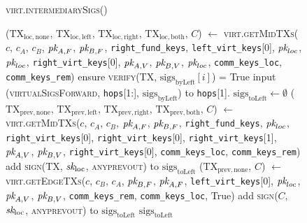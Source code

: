 \begin{figure}[H]
  \begin{processbox}{\textsc{virt.intermediarySigs}()}
    \begin{algorithmic}[1]
      \Indent
        \State ($\mathrm{TX}_{\mathrm{loc}, \mathrm{none}}$,
        $\mathrm{TX}_{\mathrm{loc}, \mathrm{left}}$, $\mathrm{TX}_{\mathrm{loc},
        \mathrm{right}}$, $\mathrm{TX}_{\mathrm{loc}, \mathrm{both}}$, $C$)
        $\gets$ \textsc{virt.getMidTXs}($c$, $c_A$, $c_B$, $\textit{pk}_{A, F}$, $\textit{pk}_{B,
        F}$, \texttt{right\_fund\_keys}, \texttt{left\_virt\_keys}[0],
        $\textit{pk}_{loc}$, $\textit{pk}_{loc}$, \texttt{right\_virt\_keys}[0], $\textit{pk}_{A, V}$,
        $\textit{pk}_{B, V}$, $\textit{pk}_{loc}$, \texttt{comm\_keys\_loc},
        \texttt{comm\_keys\_rem})
          \State ensure \textsc{verify}(TX,
          $\mathrm{sigs}_{\mathrm{byLeft}}[i]$) = True
        \EndFor
        \State input (\textsc{virtualSigsForward}, \texttt{hops}[1:],
        $\mathrm{sigs}_{\mathrm{byLeft}}$) to \texttt{hops}[1].\alice{}
        \State {}
        \State $\mathrm{sigs}_{\mathrm{toLeft}} \gets \emptyset$
         
          \State ($\mathrm{TX}_{\mathrm{prev}, \mathrm{none}}$,
          $\mathrm{TX}_{\mathrm{prev}, \mathrm{left}}$,
          $\mathrm{TX}_{\mathrm{prev}, \mathrm{right}}$,
          $\mathrm{TX}_{\mathrm{prev}, \mathrm{both}}$, $C$) $\gets$
          \textsc{virt.getMidTXs}($c$, $c_A$, $c_B$, $\textit{pk}_{A, F}$, $\textit{pk}_{B, F}$,
          \texttt{right\_fund\_keys}, $\textit{pk}_{loc}$,
          \texttt{right\_virt\_keys}[0], \texttt{right\_virt\_keys}[0],
          \texttt{right\_virt\_keys}[1], $\textit{pk}_{A, V}$, $\textit{pk}_{B, V}$,
          \texttt{right\_virt\_keys}[0], \texttt{comm\_keys\_loc},
          \texttt{comm\_keys\_rem})
            \State add \textsc{sign}(TX, $\textit{sk}_{\mathrm{loc}}$,
            \textsc{anyprevout}) to $\mathrm{sigs}_{\mathrm{toLeft}}$
          \EndFor
        \Else \: 
          \State ($\mathrm{TX}_{\mathrm{prev}, \mathrm{none}}$, $C$) $\gets$
          \textsc{virt.getEdgeTXs}($c$, $c_B$, $c_A$, $\textit{pk}_{B, F}$, $\textit{pk}_{A, F}$,
          \texttt{left\_virt\_keys}[0], $\textit{pk}_{loc}$,  $\textit{pk}_{A, V}$, $\textit{pk}_{B, V}$,
          \texttt{comm\_keys\_rem}, \texttt{comm\_keys\_loc}, True)
          \State add \textsc{sign}($C$, $\textit{sk}_{\mathrm{loc}}$,
          \textsc{anyprevout}) to $\mathrm{sigs}_{\mathrm{toLeft}}$
        \EndIf
        \State \Return $\mathrm{sigs}_{\mathrm{toLeft}}$
      \EndIndent
    \end{algorithmic}
  \end{processbox}
  \caption{}
  \label{code:virtual-layer:intermediary-sigs}
\end{figure}

